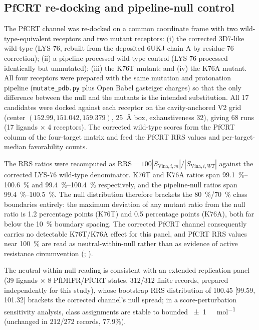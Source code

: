 \documentclass[journal=jcisd8,manuscript=suppinfo]{achemso}
\begin{document}
\subsection{PfCRT re-docking and pipeline-null control}\label{sec:sm_val_redock_null}
The PfCRT channel was re-docked on a common coordinate frame with two wild-type-equivalent receptors and two mutant receptors: (i) the corrected 3D7-like wild-type (LYS-76, rebuilt from the deposited 6UKJ chain A by residue-76 correction); (ii) a pipeline-processed wild-type control (LYS-76 processed identically but unmutated); (iii) the K76T mutant; and (iv) the K76A mutant. All four receptors were prepared with the same mutation and protonation pipeline (\texttt{mutate\_pdb.py} plus Open Babel gasteiger charges) so that the only difference between the null and the mutants is the intended substitution. All \num{17} candidates were docked against each receptor on the cavity-anchored V2 grid (center $(\num{152.99}, \num{151.042}, \num{159.379})$, \qty{25}{\angstrom} box, exhaustiveness \num{32}), giving \num{68} runs (\num{17} ligands $\times$ \num{4} receptors). The corrected wild-type scores form the PfCRT column of the four-target matrix and feed the PfCRT RRS values and per-target-median favorability counts.

The RRS ratios were recomputed as $\mathrm{RRS}=100|S_{\mathrm{Vina},i,m}|/|S_{\mathrm{Vina},i,WT}|$ against the corrected LYS-76 wild-type denominator. K76T and K76A ratios span \qtyrange{99.1}{100.6}{\percent} and \qtyrange{99.4}{100.4}{\percent} respectively, and the pipeline-null ratios span \qtyrange{99.4}{100.5}{\percent}. The null distribution therefore brackets the \qty{80}{\percent}/\qty{70}{\percent} class boundaries entirely: the maximum deviation of any mutant ratio from the null ratio is \num{1.2} percentage points (K76T) and \num{0.5} percentage points (K76A), both far below the \qty{10}{\percent} boundary spacing. The corrected PfCRT channel consequently carries no detectable K76T/K76A effect for this panel, and PfCRT RRS values near \qty{100}{\percent} are read as neutral-within-null rather than as evidence of active resistance circumvention (; ).

The neutral-within-null reading is consistent with an extended replication panel (39 ligands $\times$ 8 PfDHFR/PfCRT states, 312/312 finite records, prepared independently for this study), whose bootstrap RRS distribution of 100.45 [99.59, 101.32] brackets the corrected channel's null spread; in a score-perturbation sensitivity analysis, class assignments are stable to bounded \qty{\pm 1}{\kilo\calorie\per\mole} (unchanged in 212/272 records, 77.9\%).
\end{document}

